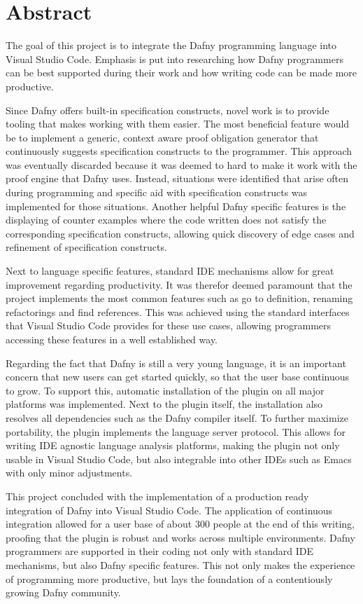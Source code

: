 \section{Abstract}
The goal of this project is to integrate the Dafny programming language into Visual Studio Code. Emphasis is put into researching how Dafny programmers can be best supported during their work and how writing code can be made more productive. \newline

Since Dafny offers built-in specification constructs, novel work is to provide tooling that makes working with them easier. The most beneficial feature would be to implement a generic, context aware proof obligation generator that continuously suggests specification constructs to the programmer. This approach was eventually discarded because it was deemed to hard to make it work with the proof engine that Dafny uses. Instead, situations were identified that arise often during programming and specific aid with specification constructs was implemented for those situations. Another helpful Dafny specific features is the displaying of counter examples where the code written does not satisfy the corresponding specification constructs, allowing quick discovery of edge cases and refinement of specification constructs. \newline

Next to language specific features, standard IDE mechanisms allow for great improvement regarding productivity. It was therefor deemed paramount that the project implements the most common features such as go to definition, renaming refactorings and find references. This was achieved using the standard interfaces that Visual Studio Code provides for these use cases, allowing programmers accessing these features in a well established way. \newline

Regarding the fact that Dafny is still a very young language, it is an important concern that new users can get started quickly, so that the user base continuous to grow. To support this, automatic installation of the plugin on all major platforms was implemented. Next to the plugin itself, the installation also resolves all dependencies such as the Dafny compiler itself. To further maximize portability, the plugin implements the language server protocol. This allows for writing IDE agnostic language analysis platforms, making the plugin not only usable in Visual Studio Code, but also integrable into other IDEs such as Emacs with only minor adjustments. \newline

This project concluded with the implementation of a production ready integration of Dafny into Visual Studio Code. The application of continuous integration allowed for a user base of about 300 people at the end of this writing, proofing that the plugin is robust and works across multiple environments. Dafny programmers are supported in their coding not only with standard IDE mechanisms, but also Dafny specific features. This not only makes the experience of programming more productive, but lays the foundation of a contentiously growing Dafny community. \newline
